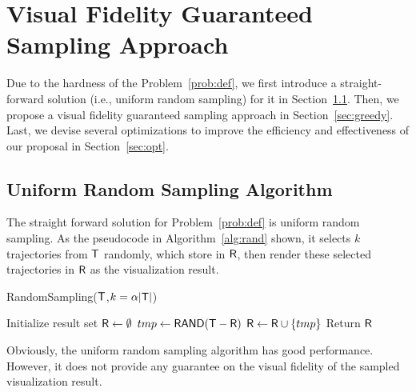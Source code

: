 \section{Visual Fidelity Guaranteed Sampling Approach}\label{sec:sol}
Due to the hardness of the Problem~\ref{prob:def}, we first introduce a straight-forward solution (i.e., uniform random sampling) for it in Section~\ref{sec:random}.
Then, we propose a visual fidelity guaranteed sampling approach in Section~\ref{sec:greedy}.
Last, we devise several optimizations to improve the efficiency and effectiveness of our proposal in Section~\ref{sec:opt}.


\subsection{Uniform Random Sampling Algorithm}\label{sec:random}
The straight forward solution for Problem~\ref{prob:def} is uniform random sampling.
As the pseudocode in Algorithm~\ref{alg:rand} shown, it selects $k$ trajectories from $\mathsf{T}$ randomly, which store in $\mathsf{R}$, then render these selected trajectories in $\mathsf{R}$ as the visualization result.

\begin{algorithm}
    \caption{RandomSampling($\mathsf{T}$,$k=\alpha |\mathsf{T}|$)} \label{alg:rand}
    \begin{algorithmic}[1]
    \State Initialize result set $\mathsf{R} \leftarrow \emptyset$
        \State $tmp \leftarrow \mathsf{RAND(\mathsf{T}-\mathsf{R})}$
        \State $\mathsf{R} \leftarrow \mathsf{R} \cup \{ tmp \}$
    \EndWhile
    \State Return $\mathsf{R}$
    \end{algorithmic}
\end{algorithm}

Obviously, the uniform random sampling algorithm has good performance.
However, it does not provide any guarantee on the visual fidelity of the sampled visualization result.





